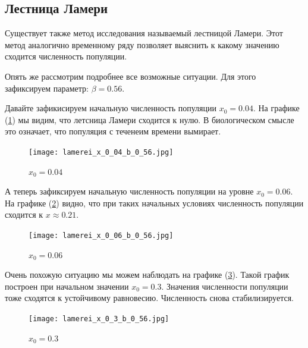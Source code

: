     \subsection{Лестница Ламери}
    
        Существует также метод исследования называемый лестницой Ламери. Этот метод аналогично временному ряду позволяет выяснить к какому значению сходится численность популяции.
            
        Опять же рассмотрим подробнее все возможные ситуации. Для этого зафиксируем параметр: \(\beta = 0.56\). 
    
        Давайте зафикисируем начальную численность популяции \(x_0 = 0.04\). На графике (\ref{lamerei_x_0_04_b_0_56}) мы видим, что летсница Ламери сходится к нулю. В биологическом смысле это означает, что популяция с теченеим времени вымирает.
    
        \begin{figure}
            \centering
            \texttt{[image: lamerei\_x\_0\_04\_b\_0\_56.jpg]}
    
            \captionsetup{justification=centering}
            \caption{\(x_0 = 0.04\)}
            \label{lamerei_x_0_04_b_0_56}
        \end{figure}
    
        А теперь зафиксируем начальную численность популяции на уровне \(x_0 = 0.06\). На графике (\ref{lamerei_x_0_06_b_0_56}) видно, что при таких начальных условиях численность популяции сходится к \(x \approx 0.21\).
            
        \begin{figure}
            \centering
            \texttt{[image: lamerei\_x\_0\_06\_b\_0\_56.jpg]}
    
            \captionsetup{justification=centering}
            \caption{\(x_0 = 0.06\)}
            \label{lamerei_x_0_06_b_0_56}
        \end{figure}
    
        Очень похожую ситуацию мы можем наблюдать на графике (\ref{lamerei_x_0_3_b_0_56}). Такой график построен при начальном значении \(x_0 = 0.3\). Значения численности популяции тоже сходятся к устойчивому равновесию. Численность снова стабилизируется.
            
        \begin{figure}
            \centering
            \texttt{[image: lamerei\_x\_0\_3\_b\_0\_56.jpg]}
    
            \captionsetup{justification=centering}
            \caption{\(x_0 = 0.3\)}
            \label{lamerei_x_0_3_b_0_56}
        \end{figure}
    
